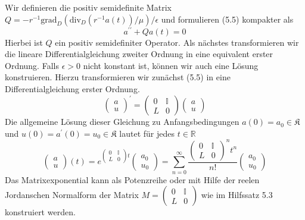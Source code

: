 \documentclass[11pt,a4paper,leqno]{report}
\numberwithin{equation}{chapter}
\begin{document}
Wir definieren die positiv semidefinite Matrix\\ $Q=-r^{-1}\text{grad}_D(\text{div}_D(r^{-1}a(t)) / \mu) / \epsilon$ und formulieren (5.5) kompakter als
\begin{equation}
	a^{\prime\prime}+Qa(t)=0
\end{equation}
Hierbei ist $Q$ ein positiv semidefiniter Operator.
Als n\"achstes transformieren wir die lineare Differentialgleichung zweiter Ordnung in eine equivalent erster Ordnung.
\fi
\noindent
Falls $\epsilon>0$ nicht konstant ist, k\"onnen wir auch eine L\"osung konstruieren. Hierzu transformieren wir zun\"achst (5.5) in eine Differentialgleichung erster Ordnung.
\begin{equation}
		\begin{pmatrix}
		a  \\ u 
	\end{pmatrix}^\prime=
	\begin{pmatrix}
		0 & \mathbb{I} \\ 
		L & 0
	\end{pmatrix}
	\begin{pmatrix}
	a  \\ u 
	\end{pmatrix}
\end{equation}
Die allgemeine L\"osung dieser Gleichung zu Anfangsbedingungen $a(0)=a_0\in\mathfrak{K}$ und $u(0)=a^\prime(0)=u_0\in\mathfrak{K}$ lautet f\"ur jedes $t\in\mathbb{R}$
\begin{equation}
\begin{pmatrix}
	a  \\ u 
\end{pmatrix}(t)=
e^{	\begin{pmatrix}
		0 & \mathbb{I} \\ 
		L & 0
\end{pmatrix}t}
	\begin{pmatrix}
	a_0  \\ u_0 
\end{pmatrix}=
\sum_{n=0}^\infty \frac{\begin{pmatrix}
		0 & \mathbb{I} \\ 
		L & 0
	\end{pmatrix}^nt^n}{n!}\begin{pmatrix}
a_0  \\ u_0 
\end{pmatrix}
\end{equation}
Das Matrixexponential kann als Potenzreihe oder mit Hilfe der reelen Jordanschen Normalform der Matrix $M=\begin{pmatrix}
	0 & \mathbb{I} \\ 
	L & 0
\end{pmatrix}$ wie im Hilfssatz 5.3 konstruiert werden.
\end{document}
